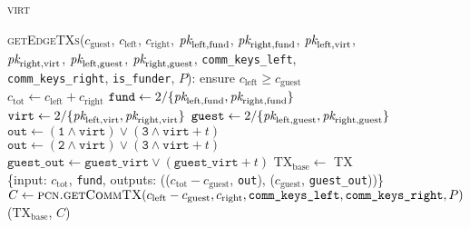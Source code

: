 \begin{figure}[H]
  \begin{processbox}{\textsc{virt}}
    \begin{algorithmic}[1]
      \State {}
      \State \textsc{getEdgeTXs}($c_{\mathrm{guest}}$, $c_{\mathrm{left}}$,
      $c_{\mathrm{right}}$, $\textit{pk}_{\mathrm{left}, \mathrm{fund}}$,
      $\textit{pk}_{\mathrm{right}, \mathrm{fund}}$, $\textit{pk}_{\mathrm{left}, \mathrm{virt}}$,
      $\textit{pk}_{\mathrm{right}, \mathrm{virt}}$, $\textit{pk}_{\mathrm{left},
      \mathrm{guest}}$, $\textit{pk}_{\mathrm{right}, \mathrm{guest}}$,
      \texttt{comm\_keys\_left}, \texttt{comm\_keys\_right},
      \texttt{is\_funder}, $P$):
      \Indent
        \State ensure $c_{\mathrm{left}} \geq c_{\mathrm{guest}}$
        \State $c_{\mathrm{tot}} \gets c_{\mathrm{left}} + c_{\mathrm{right}}$
        \State $\texttt{fund} \gets 2/\{\textit{pk}_{\mathrm{left}, \mathrm{fund}},
        \textit{pk}_{\mathrm{right}, \mathrm{fund}}\}$
        \State $\texttt{virt} \gets 2/\{\textit{pk}_{\mathrm{left}, \mathrm{virt}},
        \textit{pk}_{\mathrm{right}, \mathrm{virt}}\}$
        \State $\texttt{guest} \gets 2/\{\textit{pk}_{\mathrm{left}, \mathrm{guest}},
        \textit{pk}_{\mathrm{right}, \mathrm{guest}}\}$
          \State $\texttt{out} \gets (\texttt{1} \wedge \texttt{virt}) \vee
          (\texttt{3} \wedge \texttt{virt} + t)$
        \Else \: 
          \State $\texttt{out} \gets (\texttt{2} \wedge \texttt{virt}) \vee
          (\texttt{3} \wedge \texttt{virt} + t)$
        \EndIf
        \State $\texttt{guest\_out} \gets \texttt{guest\_virt} \vee
        (\texttt{guest\_virt} + t)$
        \State $\mathrm{TX}_{\mathrm{base}} \gets$ TX \{input:
        $c_{\mathrm{tot}}$, \texttt{fund}, outputs: (($c_{\mathrm{tot}} -
        c_{\mathrm{guest}}$, \texttt{out}), ($c_{\mathrm{guest}}$,
        \texttt{guest\_out}))\}
        \State $C \gets \textsc{pcn.getCommTX}(c_{\mathrm{left}} -
        c_{\mathrm{guest}}, c_{\mathrm{right}}, \texttt{comm\_keys\_left},
        \texttt{comm\_keys\_right}, P)$
        \State \Return ($\mathrm{TX}_{\mathrm{base}}$, $C$)
      \EndIndent
    \end{algorithmic}
  \end{processbox}
  \caption{}
  \label{code:virtual-layer:edge-txs}
\end{figure}


